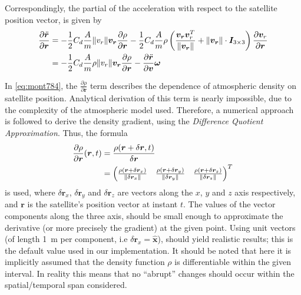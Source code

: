 Correspondingly, the partial of the acceleration with respect to the satellite position 
vector, is given by
\begin{equation}
  \label{eq:mont784}
  \begin{aligned}
    \frac{\partial \ddot{\bm{r}}}{\partial \bm{r}} &= 
    -\frac{1}{2} C_d \frac{A}{m} \lVert v_r\rVert \bm{v_r} \frac{\partial \rho}{\partial \bm{r}}
    -\frac{1}{2} C_d \frac{A}{m} \rho \left( \frac{\bm{v_r}\bm{v}^T_r}{\lVert\bm{v_r}\rVert} 
    + \lVert\bm{v_r}\rVert \cdot \bm{I}_{3\times 3} \right) \frac{\partial \bm{v}_r}{\partial \bm{r}} \\
    & = -\frac{1}{2} C_d \frac{A}{m} \rho \lVert v_r\rVert \bm{v_r} \frac{\partial \rho}{\partial \bm{r}}
      -\frac{\partial \ddot{\bm{r}}}{\partial \bm{v}} \bm{\omega} 
  \end{aligned}
\end{equation}

In \autoref{eq:mont784}, the $\frac{\partial \rho}{\partial \bm{r}}$ term describes 
the dependence of atmospheric density on satellite position. Analytical derivation 
of this term is nearly impossible, due to the complexity of the atmospheric model 
used. Therefore, a numerical approach is followed to derive the density gradient, 
using the \emph{Difference Quotient Approximation}. Thus, the formula
\begin{equation}
  \begin{aligned}
  \frac{\partial \rho}{\partial \bm{r}}(\bm{r},t) 
    &= 
      \frac{\rho (\bm{r}+\delta \bm{r}, t)}{\delta \bm{r}} \\
    &= \begin{pmatrix}
      \frac{\rho (\bm{r}+\delta \bm{r}_x)}{\lVert\delta \bm{r}_x\rVert} &
      \frac{\rho (\bm{r}+\delta \bm{r}_y)}{\lVert\delta \bm{r}_y\rVert} &
      \frac{\rho (\bm{r}+\delta \bm{r}_z)}{\lVert\delta \bm{r}_z\rVert} 
    \end{pmatrix}^T
  \end{aligned}
\end{equation}
is used, where $\delta \bm{r}_x$, $\delta \bm{r}_y$ and $\delta \bm{r}_z$ are vectors along 
the $x$, $y$ and $z$ axis respectively, and $\bm{r}$ is the satellite's position 
vector at instant $t$. The values of the vector components along the three axis, 
should be small enough to approximate the derivative (or more precisely the gradient) 
at the given point. Using unit vectors (of length \SI{1}{\meter} per component, i.e 
$\delta \bm{r}_x = \hat{\bm{x}}$), should yield realistic results; this is the 
default value used in our implementation. It should be noted that here it is 
implicitly assumed that the density function $\rho$ is differentiable within the 
given interval. In reality this means that no ``abrupt'' changes should occur within 
the spatial/temporal span considered.


